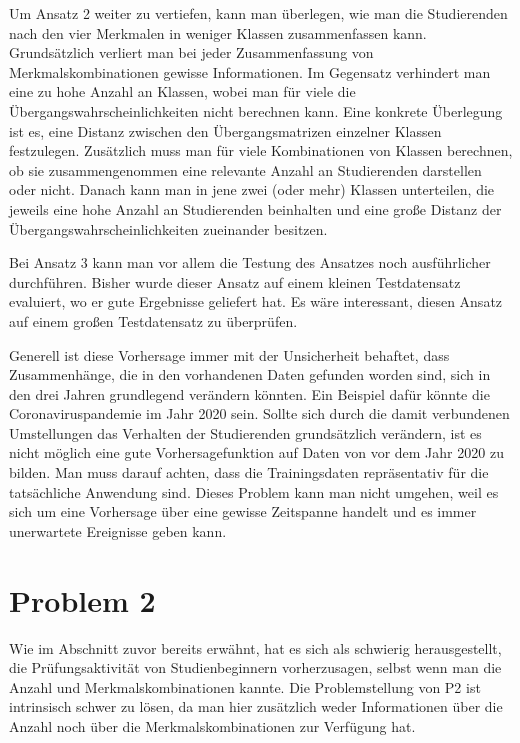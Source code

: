Um Ansatz 2 weiter zu vertiefen, kann man \"uberlegen, wie man die Studierenden nach den vier Merkmalen in weniger Klassen zusammenfassen kann. Grunds\"atzlich verliert man bei
jeder Zusammenfassung von Merkmalskombinationen gewisse Informationen. Im Gegensatz verhindert man eine zu hohe Anzahl an Klassen, wobei man f\"ur viele die \"Ubergangswahrscheinlichkeiten
nicht berechnen kann. Eine konkrete \"Uberlegung ist es, eine Distanz zwischen den \"Ubergangsmatrizen einzelner Klassen festzulegen. Zus\"atzlich muss man f\"ur viele
Kombinationen von Klassen berechnen, ob sie zusammengenommen eine relevante Anzahl an Studierenden darstellen oder nicht. Danach kann man in jene zwei (oder mehr) Klassen
unterteilen, die jeweils eine hohe Anzahl an Studierenden beinhalten und eine gro{\ss}e Distanz der \"Ubergangswahrscheinlichkeiten zueinander besitzen.

Bei Ansatz 3 kann man vor allem die Testung des Ansatzes noch ausf\"uhrlicher durchf\"uhren. Bisher wurde dieser Ansatz auf einem kleinen Testdatensatz evaluiert, wo er
gute Ergebnisse geliefert hat. Es w\"are interessant, diesen Ansatz auf einem gro{\ss}en Testdatensatz zu \"uberpr\"ufen.

Generell ist diese Vorhersage immer mit der Unsicherheit behaftet, dass Zusammenh\"ange, die in den vorhandenen Daten
gefunden worden sind, sich in den drei Jahren grundlegend ver\"andern k\"onnten. Ein Beispiel daf\"ur k\"onnte die Coronaviruspandemie im Jahr 2020 sein. Sollte sich
durch die damit verbundenen Umstellungen das Verhalten der Studierenden grunds\"atzlich ver\"andern, ist es nicht m\"oglich eine gute Vorhersagefunktion auf Daten von
vor dem Jahr 2020 zu bilden. Man muss darauf achten, dass die Trainingsdaten repr\"asentativ f\"ur die tats\"achliche Anwendung sind. Dieses Problem kann man nicht umgehen,
weil es sich um eine Vorhersage \"uber eine gewisse Zeitspanne handelt und es immer unerwartete Ereignisse geben kann.






\section{Problem 2}

Wie im Abschnitt zuvor bereits erw\"ahnt, hat es sich als schwierig herausgestellt, die Pr\"ufungsaktivit\"at von Studienbeginnern vorherzusagen, selbst
wenn man die Anzahl und Merkmalskombinationen kannte. Die Problemstellung von P2 ist intrinsisch schwer zu l\"osen, da man hier zus\"atzlich weder Informationen \"uber die Anzahl noch \"uber die
Merkmalskombinationen zur Verf\"ugung hat.

